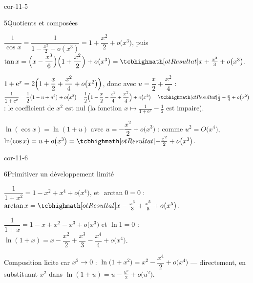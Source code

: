 \begin{blocLivre}{cor-11-5}
\begin{corrige}{5}{Quotients et composées}
\begin{questions}
  \item $\dfrac{1}{\cos x}=\dfrac{1}{1-\frac{x^{2}}{2}+o\left(x^{3}\right)}
    =1+\dfrac{x^{2}}{2}+o\bigl(x^{3}\bigr)$, puis
    $\tan x=\Bigl(x-\dfrac{x^{3}}{6}\Bigr)\Bigl(1+\dfrac{x^{2}}{2}\Bigr)
    +o\bigl(x^{3}\bigr)=\res{x+\frac{x^{3}}{3}+o\bigl(x^{3}\bigr)}$.
  \item $1+\mathrm{e}^{x}=2\Bigl(1+\dfrac{x}{2}+\dfrac{x^{2}}{4}+o\bigl(x^{2}\bigr)\Bigr)$,
    donc avec $u=\dfrac{x}{2}+\dfrac{x^{2}}{4}$ :
    $\dfrac{1}{1+\mathrm{e}^{x}}=\dfrac12\bigl(1-u+u^{2}\bigr)+o\bigl(x^{2}\bigr)
    =\dfrac12\Bigl(1-\dfrac{x}{2}-\dfrac{x^{2}}{4}+\dfrac{x^{2}}{4}\Bigr)+o\bigl(x^{2}\bigr)
    =\res{\frac12-\frac{x}{4}+o\bigl(x^{2}\bigr)}$ :
    le coefficient de $x^{2}$ est nul (la fonction $x\mapsto\frac{1}{1+\mathrm{e}^{x}}-\frac12$
    est impaire).
  \item $\ln(\cos x)=\ln(1+u)$ avec $u=-\dfrac{x^{2}}{2}+o\bigl(x^{3}\bigr)$ :
    comme $u^{2}=O\bigl(x^{4}\bigr)$,
    $\ln(\cos x)=u+o\bigl(x^{3}\bigr)=\res{-\frac{x^{2}}{2}+o\bigl(x^{3}\bigr)}$.
\end{questions}
\end{corrige}
\end{blocLivre}

\begin{blocLivre}{cor-11-6}
\begin{corrige}{6}{Primitiver un développement limité}
\begin{questions}
  \item $\dfrac{1}{1+x^{2}}=1-x^{2}+x^{4}+o\bigl(x^{4}\bigr)$, et
    $\arctan0=0$ :
    $\arctan x=\res{x-\frac{x^{3}}{3}+\frac{x^{5}}{5}+o\bigl(x^{5}\bigr)}$.
  \item $\dfrac{1}{1+x}=1-x+x^{2}-x^{3}+o\bigl(x^{3}\bigr)$ et $\ln1=0$ :
    $\ln(1+x)=x-\dfrac{x^{2}}{2}+\dfrac{x^{3}}{3}-\dfrac{x^{4}}{4}+o\bigl(x^{4}\bigr)$.
  \item Composition licite car $x^{2}\to0$ :
    $\ln\bigl(1+x^{2}\bigr)=x^{2}-\dfrac{x^{4}}{2}+o\bigl(x^{4}\bigr)$ —
    directement, en substituant $x^{2}$ dans $\ln(1+u)=u-\frac{u^{2}}{2}+o\bigl(u^{2}\bigr)$.
\end{questions}
\end{corrige}
\end{blocLivre}

